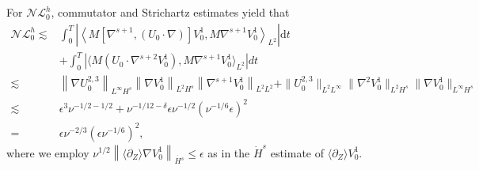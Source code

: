\documentclass[12pt]{article}
\def\d{\mathrm{d}}
\newcommand{\wtb}{\langle\partial_Z\rangle }
\newcommand{\nm}[2]{\left\| #1 \right\| _{#2} }
\numberwithin{equation}{section}
\begin{document}
    For $\mathcal{NL}^h_0$, commutator and Strichartz estimates yield that
    \begin{align*}
        \mathcal{NL}^{h}_0 \lesssim & \int_0^T \left| \left \langle M \left[\nabla^{s+1} , \left( U_0 \cdot  \nabla \right) \right]  V_0^1 , M \nabla ^{s+1} V_0^1 \right \rangle _{L^2} \right| \d t \\
        &+\int_0^T\left|\langle M (U_0\cdot\nabla^{s+2}V^1_0),M\nabla^{s+1}V^1_0\rangle_{L^2}\right|dt\\
        \lesssim & \left \| \nabla U_0^{2,3} \right \|_{L^{\infty} H^{s}} \left\|  \nabla V_0^1 \right\|_{L^2 H^s} \left\|  \nabla^{s+1} V_0^1 \right\|_{L^2 L^2}+\|U^{2,3}_0\|_{L^2L^\infty}\|\nabla^2V^1_0\|_{L^2H^s}\|\nabla V^1_0\|_{L^\infty H^s} \\
        \lesssim & \epsilon^3 \nu^{-1/2-1/2} +\nu^{-1/12-\delta}\epsilon\nu^{-1/2}(\nu^{-1/6}\epsilon)^2\\
        =&\epsilon \nu^{-2/3} (\epsilon \nu^{-1/6})^2,
    \end{align*}
    where we employ $\nu^{1/2} \nm{\wtb \nabla V_0^1 }{\dot{H^s}} \leqslant \epsilon $ as in the $\dot{H}^s$ estimate of $\wtb V_0^1$.
    \color{black}    
\end{document}
